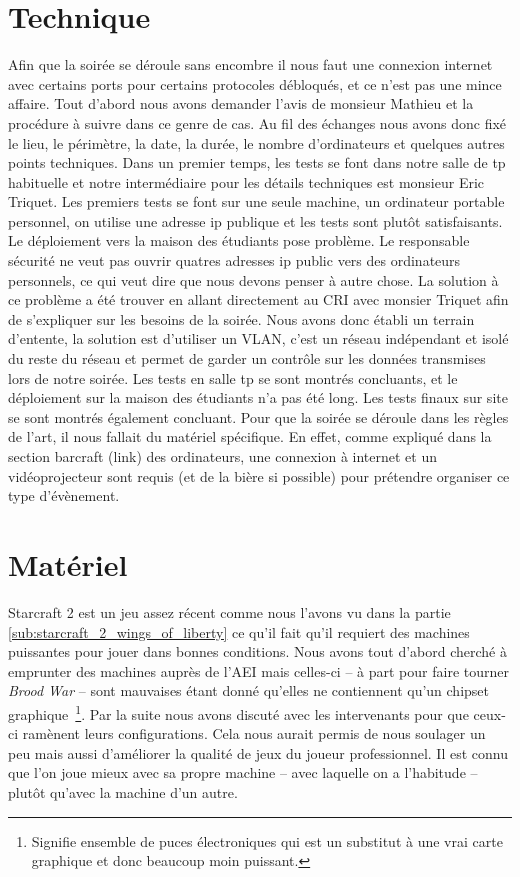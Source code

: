 \section{Technique}%
\label{sec:technique}

Afin que la soirée se déroule sans encombre il nous faut une connexion
internet avec certains ports pour certains protocoles débloqués, et ce
n'est pas une mince affaire. Tout d'abord nous avons demander l'avis de
monsieur Mathieu et la procédure à suivre dans ce genre de cas. Au fil
des échanges nous avons donc fixé le lieu, le périmètre, la date, la
durée, le nombre d'ordinateurs et quelques autres points techniques.
Dans un premier temps, les tests se font dans notre salle de tp
habituelle et notre intermédiaire pour les détails techniques est
monsieur Eric Triquet. Les premiers tests se font sur une seule machine,
un ordinateur portable personnel, on utilise une adresse ip publique et les
tests sont plutôt satisfaisants. Le déploiement vers la maison des
étudiants pose problème. Le responsable sécurité ne veut pas ouvrir
quatres adresses ip public vers des ordinateurs personnels, ce qui veut
dire que nous devons penser à autre chose.  La solution à ce problème a
été trouver en allant directement au CRI avec monsier Triquet afin de
s'expliquer sur les besoins de la soirée.  Nous avons donc établi un
terrain d'entente, la solution est d'utiliser un VLAN, c'est un réseau
indépendant et isolé du reste du réseau et permet de garder un contrôle
sur les données transmises lors de notre soirée.  Les tests en salle tp
se sont montrés concluants, et le déploiement sur la maison des
étudiants n'a pas été long. Les tests finaux sur site se sont montrés
également concluant.
Pour que la soirée se déroule dans les règles de l'art, il nous fallait
du matériel spécifique. En effet, comme expliqué dans la section
barcraft (link) des ordinateurs, une connexion à internet et un
vidéoprojecteur sont requis (et de la bière si possible) pour prétendre
organiser ce type d'évènement.

\section{Matériel}%
\label{sec:materiel}

Starcraft 2 est un jeu assez récent comme nous l'avons vu dans la
partie \ref{sub:starcraft_2_wings_of_liberty} ce qu'il fait qu'il requiert des machines puissantes pour jouer
dans bonnes conditions. Nous avons tout d'abord cherché à emprunter des
machines auprès de l'AEI mais celles-ci -- à part pour faire tourner
\emph{Brood
War} -- sont mauvaises étant donné qu'elles ne contiennent qu'un chipset
graphique\, \footnote{Signifie \og ensemble de puces électroniques \fg{}
qui est un substitut à une vrai carte graphique et donc beaucoup moin
puissant.}. Par la suite nous avons discuté avec les
intervenants pour que ceux-ci ramènent leurs configurations. Cela nous
aurait permis de nous soulager un peu mais aussi d'améliorer la qualité
de jeux du joueur professionnel. Il est connu que l'on joue mieux avec sa
propre machine -- avec laquelle on a l'habitude -- plutôt qu'avec la machine d'un
autre.

